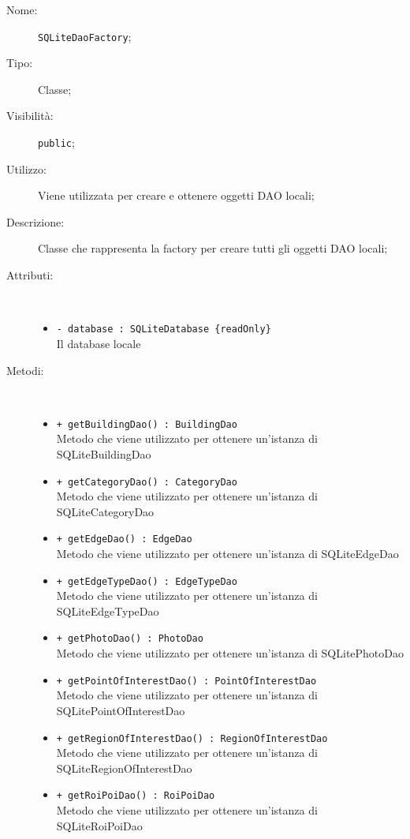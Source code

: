 \documentclass[../DefinizioneDiProdotto.tex]{subfiles}
\begin{document}
    \begin{description}
\item[Nome:] \texttt{SQLiteDaoFactory};
\item[Tipo:] Classe;
\item[Visibilità:] \texttt{public};
\item[Utilizzo:] Viene utilizzata per creare e ottenere oggetti DAO locali;
\item[Descrizione:] Classe che rappresenta la factory per creare tutti gli oggetti DAO locali;
\item[Attributi:] \
\begin{itemize}
\item \texttt{- database : SQLiteDatabase \{readOnly\}}\\
Il database locale

\end{itemize}
\item[Metodi:] \
\begin{itemize}
\item \texttt{+ getBuildingDao() : BuildingDao}\\
Metodo che viene utilizzato per ottenere un'istanza di SQLiteBuildingDao
 \item \texttt{+ getCategoryDao() : CategoryDao}\\
Metodo che viene utilizzato per ottenere un'istanza di SQLiteCategoryDao
 \item \texttt{+ getEdgeDao() : EdgeDao}\\
Metodo che viene utilizzato per ottenere un'istanza di SQLiteEdgeDao
 \item \texttt{+ getEdgeTypeDao() : EdgeTypeDao}\\
Metodo che viene utilizzato per ottenere un'istanza di SQLiteEdgeTypeDao
 \item \texttt{+ getPhotoDao() : PhotoDao}\\
Metodo che viene utilizzato per ottenere un'istanza di SQLitePhotoDao
 \item \texttt{+ getPointOfInterestDao() : PointOfInterestDao}\\
Metodo che viene utilizzato per ottenere un'istanza di SQLitePointOfInterestDao
 \item \texttt{+ getRegionOfInterestDao() : RegionOfInterestDao}\\
Metodo che viene utilizzato per ottenere un'istanza di SQLiteRegionOfInterestDao
 \item \texttt{+ getRoiPoiDao() : RoiPoiDao}\\
Metodo che viene utilizzato per ottenere un'istanza di SQLiteRoiPoiDao

\end{itemize}
\end{description}
\end{document}
